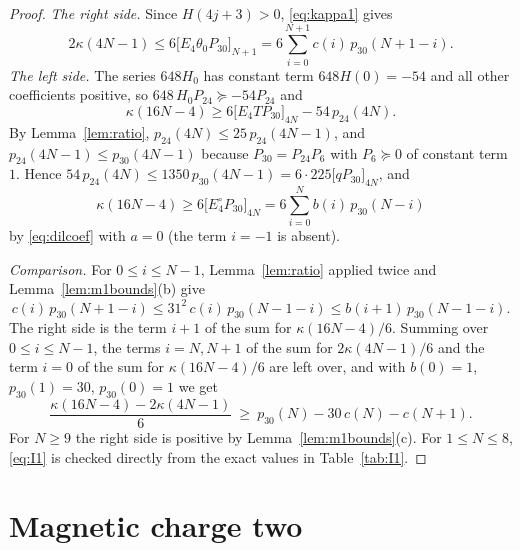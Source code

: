 \documentclass[11pt]{amsart}
\theoremstyle{definition}
\newcommand{\coef}[2]{\big[#1\big]_{#2}}
\begin{document}
\begin{proof}
\emph{The right side.} Since $H(4j+3)>0$, \eqref{eq:kappa1} gives
\[
2\kappa(4N-1)\le6\coef{E_4\theta_0P_{30}}{N+1}=6\sum_{i=0}^{N+1}c(i)\,p_{30}(N+1-i).
\]
\emph{The left side.} The series $648H_0$ has constant term $648H(0)=-54$ and all other coefficients positive, so $648\,H_0P_{24}\succeq-54P_{24}$ and
\[
\kappa(16N-4)\ge6\coef{E_4TP_{30}}{4N}-54\,p_{24}(4N).
\]
By Lemma~\ref{lem:ratio}, $p_{24}(4N)\le25\,p_{24}(4N-1)$, and $p_{24}(4N-1)\le p_{30}(4N-1)$ because $P_{30}=P_{24}P_6$ with $P_6\succeq0$ of constant term $1$. Hence $54\,p_{24}(4N)\le1350\,p_{30}(4N-1)=6\cdot225\coef{qP_{30}}{4N}$, and
\[
\kappa(16N-4)\ge6\coef{E_4^\circ P_{30}}{4N}=6\sum_{i=0}^{N}b(i)\,p_{30}(N-i)
\]
by \eqref{eq:dilcoef} with $a=0$ (the term $i=-1$ is absent).

\emph{Comparison.} For $0\le i\le N-1$, Lemma~\ref{lem:ratio} applied twice and Lemma~\ref{lem:m1bounds}(b) give
\[
c(i)\,p_{30}(N+1-i)\le31^2\,c(i)\,p_{30}(N-1-i)\le b(i+1)\,p_{30}(N-1-i).
\]
The right side is the term $i+1$ of the sum for $\kappa(16N-4)/6$. Summing over $0\le i\le N-1$, the terms $i=N,N+1$ of the sum for $2\kappa(4N-1)/6$ and the term $i=0$ of the sum for $\kappa(16N-4)/6$ are left over, and with $b(0)=1$, $p_{30}(1)=30$, $p_{30}(0)=1$ we get
\[
\frac{\kappa(16N-4)-2\kappa(4N-1)}6\ \ge\ p_{30}(N)-30\,c(N)-c(N+1).
\]
For $N\ge9$ the right side is positive by Lemma~\ref{lem:m1bounds}(c). For $1\le N\le8$, \eqref{eq:I1} is checked directly from the exact values in Table~\ref{tab:I1}.
\end{proof}

\section{Magnetic charge two}\label{sec:m2}
\end{document}
